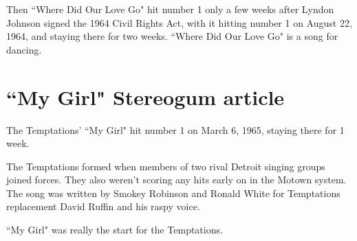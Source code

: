 \documentclass[12pt, a4paper, twoside, openright, titlepage]{book}
\begin{document}
Then ``Where Did Our Love Go" hit number 1 only a few weeks after Lyndon Johnson signed the 1964 Civil Rights Act, with it hitting number 1 on August 22, 1964, and staying there for two weeks. ``Where Did Our Love Go" is a song for dancing. 


\section{``My Girl" Stereogum article}

The Temptations' ``My Girl" hit number 1 on March 6, 1965, staying there for 1 week.


The Temptations formed when members of two rival Detroit singing groups joined forces. They also weren't scoring any hits early on in the Motown system. The song was written by Smokey Robinson and Ronald White for Temptations replacement David Ruffin and his raspy voice. 

``My Girl" was really the start for the Temptations.
\end{document}
